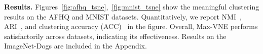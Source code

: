 \documentclass{article}
\theoremstyle{plain}
\theoremstyle{definition}
\begin{document}
\textbf{Results.}
Figures~\ref{fig:afhq_tsne},~\ref{fig:mnist_tsne} show the meaningful clustering results on the AFHQ and MNIST datasets. Quantitatively, 
we report NMI~\cite{mcdaid2013normalizedmutualinformationevaluate},
ARI~\cite{vinh2009information}, and clustering accuracy (ACC)~\cite{kuhn1955hungarian} in the figure. Overall, Max-VNE performs satisfactorily across datasets, indicating its effectiveness.  Results on the ImageNet-Dogs are included in the Appendix.




%




\newpage



\end{document}
